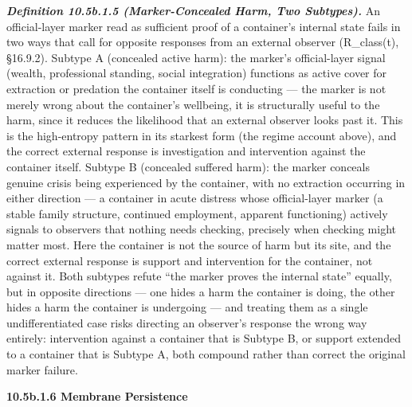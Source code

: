 \documentclass[
]{article}
\begin{document}
\emph{\textbf{Definition 10.5b.1.5 (Marker-Concealed Harm, Two
Subtypes).}} An official-layer marker read as sufficient proof of a
container's internal state fails in two ways that call for opposite
responses from an external observer (R\_class(t), §16.9.2). Subtype A
(concealed active harm): the marker's official-layer signal (wealth,
professional standing, social integration) functions as active cover for
extraction or predation the container itself is conducting --- the
marker is not merely wrong about the container's wellbeing, it is
structurally useful to the harm, since it reduces the likelihood that an
external observer looks past it. This is the high-entropy pattern in its
starkest form (the regime account above), and the correct external
response is investigation and intervention against the container itself.
Subtype B (concealed suffered harm): the marker conceals genuine crisis
being experienced by the container, with no extraction occurring in
either direction --- a container in acute distress whose official-layer
marker (a stable family structure, continued employment, apparent
functioning) actively signals to observers that nothing needs checking,
precisely when checking might matter most. Here the container is not the
source of harm but its site, and the correct external response is
support and intervention for the container, not against it. Both
subtypes refute ``the marker proves the internal state'' equally, but in
opposite directions --- one hides a harm the container is doing, the
other hides a harm the container is undergoing --- and treating them as
a single undifferentiated case risks directing an observer's response
the wrong way entirely: intervention against a container that is Subtype
B, or support extended to a container that is Subtype A, both compound
rather than correct the original marker failure.

\textbf{10.5b.1.6 Membrane Persistence}
\end{document}
